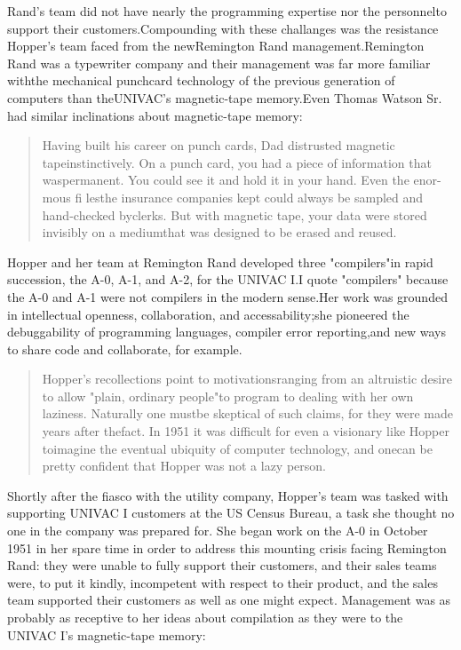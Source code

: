 Rand's team did not have nearly the programming expertise nor the personnelto 
support their customers.Compounding with these challanges was the resistance 
Hopper's team faced from the newRemington Rand management.Remington Rand was a 
typewriter company and their management was far more familiar withthe 
mechanical punchcard technology of the previous generation of computers than 
theUNIVAC's magnetic-tape memory.Even Thomas Watson Sr. had similar 
inclinations about magnetic-tape memory:
\begin{quotation}
    Having built his career on punch cards, Dad distrusted magnetic 
tapeinstinctively. On a punch card, you had a piece of information that 
waspermanent. You could see it and hold it in your hand. Even the enor-mous fi 
lesthe insurance companies kept could always be sampled and hand-checked 
byclerks. But with magnetic tape, your data were stored invisibly on a 
mediumthat was designed to be erased and 
reused.\cite{grace_hopper_and_the_invention_of_the_information_age_2009}
\end{quotation}
Hopper and her team at Remington Rand developed three "compilers"in rapid 
succession, the A-0, A-1, and A-2, for the UNIVAC I.I quote "compilers" because 
the A-0 and A-1 were not compilers in the modern sense.Her work was grounded in 
intellectual openness, collaboration, and accessability;she pioneered the 
debuggability of programming languages, compiler error reporting,and new ways 
to share code and collaborate, for example.
\begin{quotation}
    Hopper's recollections point to motivationsranging from an altruistic 
desire to allow "plain, ordinary people"to program to dealing with her own 
laziness. Naturally one mustbe skeptical of such claims, for they were made 
years after thefact. In 1951 it was difficult for even a visionary like Hopper 
toimagine the eventual ubiquity of computer technology, and onecan be pretty 
confident that Hopper was not a lazy person.
    \cite{grace_hopper_and_the_invention_of_the_information_age_2009}
\end{quotation}
Shortly after the fiasco with the utility company, Hopper's team was tasked
with supporting UNIVAC I customers at the US Census Bureau, a task she thought
no one in the company was prepared for. She began work on the A-0 in October
1951 in her spare time in order to address this mounting crisis facing
Remington Rand: they were unable to fully support their customers, and their
sales teams were, to put it kindly, incompetent with respect to their product,
and the sales team supported their customers as well as one might expect.
Management was as probably as receptive to her ideas about compilation as they
were to the UNIVAC I's magnetic-tape memory:

